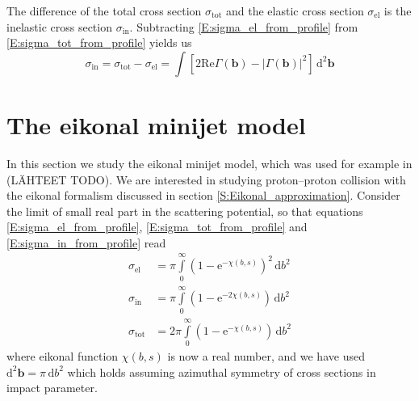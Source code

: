 \documentclass[a4paper, twoside, english, 12pt]{article}
\begin{document}
The difference of the total cross section $\sigma_\text{tot}$ and the elastic cross section $\sigma_\text{el}$ is the inelastic cross section $\sigma_\text{in}$. Subtracting \eqref{E:sigma_el_from_profile} from \eqref{E:sigma_tot_from_profile} yields us
\begin{equation}\label{E:sigma_in_from_profile}
	\sigma_\text{in} = \sigma_\text{tot} - \sigma_\text{el} = \int \left[ 2\text{Re}\Gamma(\mathbf{b}) - \left|\Gamma(\mathbf{b})\right|^2 \right] \,\text{d}^2\mathbf{b}
\end{equation}



\section{The eikonal minijet model}\label{S:malli}


In this section we study the eikonal minijet model, which was used for example in (LÄHTEET TODO). We are interested in studying proton--proton collision with the eikonal formalism discussed in section \ref{S:Eikonal_approximation}. Consider the limit of small real part in the scattering potential, so that equations \eqref{E:sigma_el_from_profile}, \eqref{E:sigma_tot_from_profile} and \eqref{E:sigma_in_from_profile} read
\begin{align}
	\sigma_{\text{el}} &= \pi\int\limits_0^\infty \left(1-\text{e}^{-\chi(b,s)} \right)^2 \, \text{d}b^2 \label{E:sigma_el} \\[0.8em]
	\sigma_\text{in} &= \pi\int\limits_0^\infty \left(1-\text{e}^{-2\chi(b,s)} \right) \, \text{d}b^2 \label{E:sigma_in} \\[0.8em]
	\sigma_\text{tot} &= 2\pi\int\limits_0^\infty \left(1-\text{e}^{-\chi(b,s)} \right) \, \text{d}b^2 \label{E:sigma_tot}
\end{align}
where eikonal function $\chi(b,s)$ is now a real number, and we have used $\text{d}^2\mathbf{b} = \pi\,\text{d}b^2$ which holds assuming azimuthal symmetry of cross sections in impact parameter.
\end{document}
